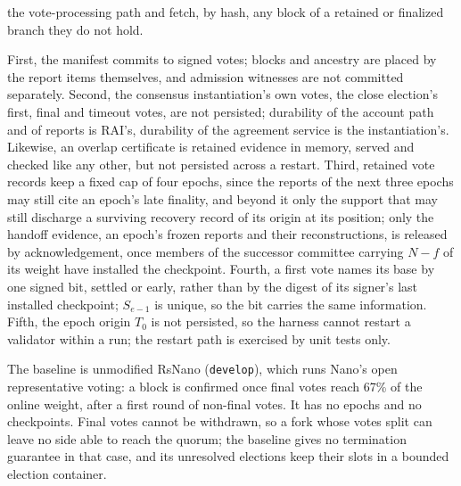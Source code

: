 the vote-processing path and fetch, by hash, any block of a retained or finalized branch they do not hold.

First, the manifest commits to signed votes; blocks and ancestry are placed by the report items themselves, and admission witnesses are not committed separately. Second, the consensus instantiation's own votes, the close election's first, final and timeout votes, are not persisted; durability of the account path and of reports is RAI's, durability of the agreement service is the instantiation's. Likewise, an overlap certificate is retained evidence in memory, served and checked like any other, but not persisted across a restart. Third, retained vote records keep a fixed cap of four epochs, since the reports of the next three epochs may still cite an epoch's late finality, and beyond it only the support that may still discharge a surviving recovery record of its origin at its position; only the handoff evidence, an epoch's frozen reports and their reconstructions, is released by acknowledgement, once members of the successor committee carrying $N-f$ of its weight have installed the checkpoint. Fourth, a first vote names its base by one signed bit, settled or early, rather than by the digest of its signer's last installed checkpoint; $S_{e-1}$ is unique, so the bit carries the same information. Fifth, the epoch origin $T_0$ is not persisted, so the harness cannot restart a validator within a run; the restart path is exercised by unit tests only.

The baseline is unmodified RsNano (\texttt{develop}), which runs Nano's open representative voting: a block is confirmed once final votes reach 67\% of the online weight, after a first round of non-final votes. It has no epochs and no checkpoints. Final votes cannot be withdrawn, so a fork whose votes split can leave no side able to reach the quorum; the baseline gives no termination guarantee in that case, and its unresolved elections keep their slots in a bounded election container.

